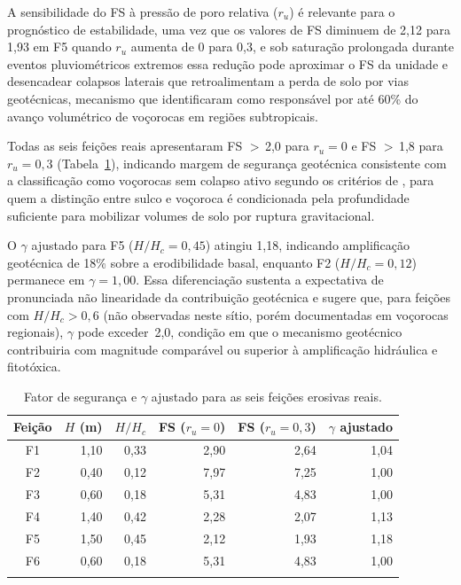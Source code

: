 \documentclass[pdflatex,sn-basic]{sn-jnl}
\begin{document}
A sensibilidade do FS à pressão de poro relativa ($r_u$) é relevante para o prognóstico de estabilidade, uma vez que os valores de FS diminuem de 2,12 para 1,93 em F5 quando $r_u$ aumenta de 0 para 0,3, e sob saturação prolongada durante eventos pluviométricos extremos essa redução pode aproximar o FS da unidade e desencadear colapsos laterais que retroalimentam a perda de solo por vias geotécnicas, mecanismo que \citet{vanmaercke_et_al_2021} identificaram como responsável por até 60\% do avanço volumétrico de voçorocas em regiões subtropicais.

Todas as seis feições reais apresentaram FS $>$\,2,0 para $r_u = 0$ e FS $>$\,1,8 para $r_u = 0{,}3$ (Tabela~\ref{tab:fs}), indicando margem de segurança geotécnica consistente com a classificação como voçorocas sem colapso ativo segundo os critérios de \citet{poesen_2018}, para quem a distinção entre sulco e voçoroca é condicionada pela profundidade suficiente para mobilizar volumes de solo por ruptura gravitacional.

O $\gamma$ ajustado para F5 ($H/H_c = 0{,}45$) atingiu 1,18, indicando amplificação geotécnica de 18\% sobre a erodibilidade basal, enquanto F2 ($H/H_c = 0{,}12$) permanece em $\gamma = 1{,}00$. Essa diferenciação sustenta a expectativa de pronunciada não linearidade da contribuição geotécnica e sugere que, para feições com $H/H_c > 0{,}6$ (não observadas neste sítio, porém documentadas em voçorocas regionais), $\gamma$ pode exceder~2,0, condição em que o mecanismo geotécnico contribuiria com magnitude comparável ou superior à amplificação hidráulica e fitotóxica.

\begin{table}[htbp]
\centering
\caption{Fator de segurança e $\gamma$ ajustado para as seis feições erosivas reais.}
\label{tab:fs}
\small
\begin{tabular}{@{}c r r r r r@{}}
\toprule
Feição & $H$ (m) & $H/H_c$ & FS ($r_u = 0$) & FS ($r_u = 0{,}3$) & $\gamma$ ajustado \\
\midrule
F1 & 1,10 & 0,33 & 2,90 & 2,64 & 1,04 \\
F2 & 0,40 & 0,12 & 7,97 & 7,25 & 1,00 \\
F3 & 0,60 & 0,18 & 5,31 & 4,83 & 1,00 \\
F4 & 1,40 & 0,42 & 2,28 & 2,07 & 1,13 \\
F5 & 1,50 & 0,45 & 2,12 & 1,93 & 1,18 \\
F6 & 0,60 & 0,18 & 5,31 & 4,83 & 1,00 \\
\botrule
\end{tabular}
\end{table}
\end{document}
